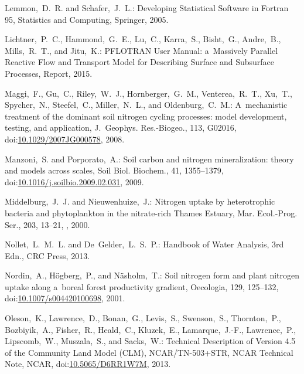 \documentclass[gmd,noline]{copernicus}
\begin{document}
\begin{thebibliography}{55}
Lemmon,~D.~R. and Schafer,~J.~L.:
Developing Statistical Software in Fortran 95, Statistics and Computing,
Springer,   2005.


Lichtner,~P.~C., Hammond,~G.~E., Lu,~C., Karra,~S., Bisht,~G., Andre,~B., Mills,~R.~T., and Jitu,~K.:
PFLOTRAN User Manual: a~Massively Parallel Reactive Flow and Transport Model for Describing Surface and Subsurface Processes, Report,
  2015.


Maggi,~F., Gu,~C., Riley,~W.~J., Hornberger,~G.~M., Venterea,~R.~T., Xu,~T., Spycher,~N., Steefel,~C., Miller,~N.~L., and Oldenburg,~C.~M.:
A~mechanistic treatment of the dominant soil nitrogen cycling processes: model development, testing, and application,
J.~Geophys. Res.-Biogeo.,
113, G02016,
doi:\href{http://dx.doi.org/10.1029/2007JG000578}{10.1029/2007JG000578}, 2008.


Manzoni,~S. and Porporato,~A.:
Soil carbon and nitrogen mineralization: theory and models across scales,
Soil Biol. Biochem.,
41, 1355--1379,
doi:\href{http://dx.doi.org/10.1016/j.soilbio.2009.02.031}{10.1016/j.soilbio.2009.02.031}, 2009.


Middelburg,~J.~J. and Nieuwenhuize,~J.:
Nitrogen uptake by heterotrophic bacteria and phytoplankton in the nitrate-rich Thames Estuary,
Mar. Ecol.-Prog. Ser.,
203, 13--21,
,
  2000.


Nollet,~L.~M.~L. and De~Gelder,~L.~S.~P.:
Handbook of Water Analysis, 3rd Edn.,
CRC Press,   2013.


Nordin,~A., H\"{o}gberg,~P., and N\"{a}sholm,~T.:
Soil nitrogen form and plant nitrogen uptake along a~boreal forest productivity gradient,
Oecologia,
129, 125--132,
doi:\href{http://dx.doi.org/10.1007/s004420100698}{10.1007/s004420100698}, 2001.


Oleson,~K., Lawrence,~D., Bonan,~G., Levis,~S., Swenson,~S., Thornton,~P., Bozbiyik,~A., Fisher,~R., Heald,~C., Kluzek,~E., Lamarque,~J.-F., Lawrence,~P., Lipscomb,~W., Muszala,~S., and Sacks,~W.:
Technical Description of Version 4.5 of the Community Land Model (CLM),
NCAR/TN-503+STR, NCAR Technical Note,
NCAR,
doi:\href{http://dx.doi.org/10.5065/D6RR1W7M}{10.5065/D6RR1W7M}, 2013.



\end{thebibliography}
\end{document}
